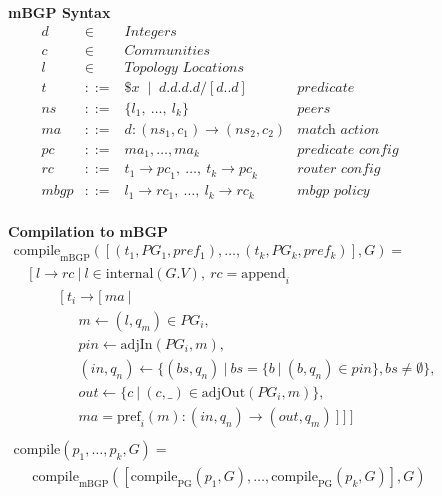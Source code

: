 \documentclass[numbers, 10pt, preprint]{sigplanconf}
\newcommand{\BNFALT}{\;\;|\;\;}
\newcommand{\hdr}[2]{\flushleft \chdr{\hspace{5mm}#1}{#2}}
\newcommand{\chdr}[2]{\textbf{#1} {#2} \\ \centering}%
\begin{document}
\vspace{2em}
\begin{figure}[t!]\small%
  

  \begin{minipage}[t]{.47\linewidth}
  \hdr{mBGP Syntax}{}
  \vspace*{-1\baselineskip}
  \[ \begin{array}{rclr}
     d    &\in& \textit{Integers} & \\
     c    &\in& \textit{Communities} & \\
     l    &\in& \textit{Topology Locations} & \\
     t    &::=& \$x \BNFALT d.d.d.d/[d..d] & \textit{predicate} \\
     ns   &::=& \{ l_1, ~\dots,~ l_k \} & \textit{peers} \\
     ma   &::=& d : ({ns}_1, c_1) \rightarrow ({ns}_2, c_2) & \textit{match action} \\
     pc   &::=& ma_1, \dots, ma_k & \textit{predicate config} \\
     rc   &::=& t_1 \rightarrow {pc}_1, ~\dots,~ t_k \rightarrow {pc}_k & \textit{router config} \\
     mbgp &::=& l_1 \rightarrow {rc}_1, ~\dots,~ l_k \rightarrow {rc}_k & \textit{mbgp policy} \\%
  \end{array} \]%

  \end{minipage}
  \begin{minipage}[t]{.49\linewidth}
  \hdr{Compilation to mBGP}{}
  \vspace*{-1\baselineskip}
  \[ \begin{array}{l}
     \mathrm{compile}_\mathrm{mBGP}( [(t_1,PG_1,pref_1), \dots, (t_k,PG_k,pref_k)], G ) = \\
     ~~~~~ [~ l \rightarrow rc ~\vert~ l \in \mathrm{internal}(G.V), ~rc = \mathrm{append}_i~  \\
     ~~~~~~~~~~~~~~~ [~ t_i \rightarrow [~ ma ~\vert~ \\
     ~~~~~~~~~~~~~~~~~~~~~ m \leftarrow (l,q_m) \in PG_i, \\
     ~~~~~~~~~~~~~~~~~~~~~ pin \leftarrow \mathrm{adjIn}(PG_i,m), \\
     ~~~~~~~~~~~~~~~~~~~~~ (in,q_n) \leftarrow \{ (bs,q_n) ~\vert~ bs=\{b ~\vert~ (b,q_n) \in pin \}, bs \neq \emptyset \}, \\
     ~~~~~~~~~~~~~~~~~~~~~ out \leftarrow \{ c ~\vert~ (c,\_) \in \mathrm{adjOut}(PG_i,m) \}, \\
     ~~~~~~~~~~~~~~~~~~~~~ ma = \mathrm{pref}_i(m) : (in,q_n) \rightarrow (out,q_m) ~] ~] ~] \\
     \\
     \mathrm{compile}( p_1, \dots, p_k, G) = \\
     ~~~~~~ \mathrm{compile}_\mathrm{mBGP}([\mathrm{compile}_\mathrm{PG}(p_1,G), \dots, \mathrm{compile}_\mathrm{PG}(p_k,G)], G) \\
  \end{array} \]%
  \end{minipage}%


\end{figure}
\end{document}
